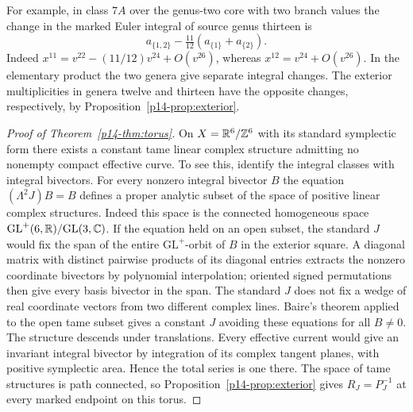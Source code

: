 For example, in class $7A$ over the genus-two core with two branch
values the change in the marked Euler integral of source genus
thirteen is
\[
 a_{\{1,2\}}-\tfrac{11}{12}(a_{\{1\}}+a_{\{2\}}).
\]
Indeed $x^{11}=v^{22}-(11/12)v^{24}+O(v^{26})$, whereas
$x^{12}=v^{24}+O(v^{26})$. In the elementary product the two genera
give separate integral changes. The exterior multiplicities in
genera twelve and thirteen have the opposite changes, respectively,
by Proposition~\ref{p14-prop:exterior}.

\begin{proof}[Proof of Theorem~\ref{p14-thm:torus}]
On \(X=\mathbb R^6/\mathbb Z^6\) with its standard symplectic form there exists a
constant tame linear complex structure admitting no nonempty compact
effective curve. To see this, identify the integral classes with
integral bivectors. For every nonzero integral bivector \(B\) the
equation \((\Lambda^2J)B=B\) defines a proper analytic subset of the
space of positive linear complex structures. Indeed this space is the
connected homogeneous space \(\mathrm{GL}^+(6,\mathbb R)/\mathrm{GL}(3,\mathbb C)\).
If the equation held on an open subset, the standard \(J\) would fix
the span of the entire \(\mathrm{GL}^+\)-orbit of \(B\) in the exterior
square. A diagonal matrix with distinct pairwise products of its
diagonal entries extracts the nonzero coordinate bivectors by
polynomial interpolation; oriented signed permutations then give every
basis bivector in the span. The standard \(J\) does not fix a wedge
of real coordinate vectors from two different complex lines.
Baire's theorem applied to the open tame subset gives a constant
\(J\) avoiding these equations for all \(B\ne0\). The structure descends
under translations. Every effective current would give an invariant
integral bivector by integration of its complex tangent planes, with
positive symplectic area. Hence the total series is one there.
The space of tame structures is path connected, so
Proposition~\ref{p14-prop:exterior} gives \(R_J=P_J^{-1}\) at every marked
endpoint on this torus.


\end{proof}
